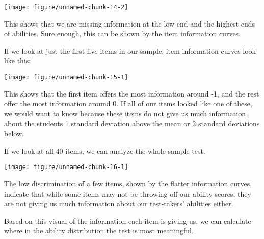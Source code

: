 \documentclass{article}\usepackage[]{graphicx}\usepackage[]{color}
\makeatletter
\def\maxwidth{ %
  \ifdim\Gin@nat@width>\linewidth
    \linewidth
  \else
    \Gin@nat@width
  \fi
}
\newenvironment{knitrout}{}{} %
\makeatother
\begin{document}
\begin{enumerate}
\begin{knitrout}
{\centering \texttt{[image: figure/unnamed-chunk-14-2]} 

}



\end{knitrout}
\raggedright
This shows that we are missing information at the low end and the highest ends of abilities. Sure enough, this can be shown by the item information curves.

\raggedright
If we look at just the first five items in our sample, item information curves look like this:

\centering
\begin{knitrout}
\color{fgcolor}

{\centering \texttt{[image: figure/unnamed-chunk-15-1]} 

}



\end{knitrout}
\raggedright
This shows that the first item offers the most information around -1, and the rest offer the most information around 0. If all of our items looked like one of these, we would want to know because these items do not give us much information about the students 1 standard deviation above the mean or 2 standard deviations below. 
\raggedright

If we look at all 40 items, we can analyze the whole sample test.

\centering
\begin{knitrout}
\color{fgcolor}

{\centering \texttt{[image: figure/unnamed-chunk-16-1]} 

}



\end{knitrout}
\raggedright
The low discrimination of a few items, shown by the flatter information curves, indicate that while some items may not be throwing off our ability scores, they are not giving us much information about our test-takers' abilities either.
\raggedright

Based on this visual of the information each item is giving us, we can calculate where in the ability distribution the test is most meaningful.

\centering
\begin{knitrout}
\color{fgcolor}


\end{knitrout}
\end{enumerate}
\end{document}
